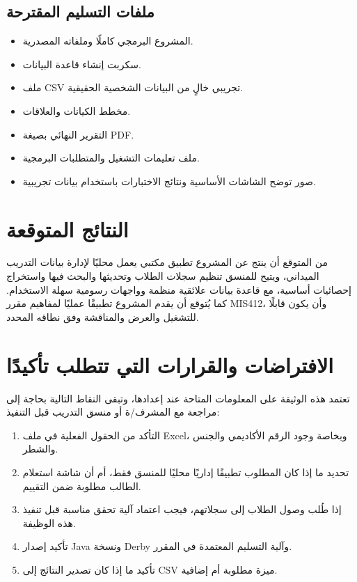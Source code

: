 \documentclass[12pt,a4paper]{article}
\begin{document}
\subsection{ملفات التسليم المقترحة}
\begin{itemize}
\item المشروع البرمجي كاملًا وملفاته المصدرية.
\item سكربت إنشاء قاعدة البيانات.
\item ملف CSV تجريبي خالٍ من البيانات الشخصية الحقيقية.
\item مخطط الكيانات والعلاقات.
\item التقرير النهائي بصيغة PDF.
\item ملف تعليمات التشغيل والمتطلبات البرمجية.
\item صور توضح الشاشات الأساسية ونتائج الاختبارات باستخدام بيانات تجريبية.
\end{itemize}

\section{النتائج المتوقعة}
من المتوقع أن ينتج عن المشروع تطبيق مكتبي يعمل محليًا لإدارة بيانات التدريب الميداني، ويتيح للمنسق تنظيم سجلات الطلاب وتحديثها والبحث فيها واستخراج إحصائيات أساسية، مع قاعدة بيانات علائقية منظمة وواجهات رسومية سهلة الاستخدام. كما يُتوقع أن يقدم المشروع تطبيقًا عمليًا لمفاهيم مقرر MIS412، وأن يكون قابلًا للتشغيل والعرض والمناقشة وفق نطاقه المحدد.

\section{الافتراضات والقرارات التي تتطلب تأكيدًا}
تعتمد هذه الوثيقة على المعلومات المتاحة عند إعدادها، وتبقى النقاط التالية بحاجة إلى مراجعة مع المشرف/ة أو منسق التدريب قبل التنفيذ:
\begin{enumerate}
\item التأكد من الحقول الفعلية في ملف Excel، وبخاصة وجود الرقم الأكاديمي والجنس والشطر.
\item تحديد ما إذا كان المطلوب تطبيقًا إداريًا محليًا للمنسق فقط، أم أن شاشة استعلام الطالب مطلوبة ضمن التقييم.
\item إذا طُلب وصول الطلاب إلى سجلاتهم، فيجب اعتماد آلية تحقق مناسبة قبل تنفيذ هذه الوظيفة.
\item تأكيد إصدار Java ونسخة Derby وآلية التسليم المعتمدة في المقرر.
\item تأكيد ما إذا كان تصدير النتائج إلى CSV ميزة مطلوبة أم إضافية.
\end{enumerate}
\end{document}
